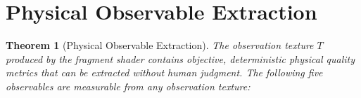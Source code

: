 \documentclass[11pt,twocolumn,a4paper]{article}
\newtheorem{theorem}{Theorem}[section]
\begin{document}

\section{Physical Observable Extraction}
\label{sec:observables}

\begin{theorem}[Physical Observable Extraction]
\label{thm:observables}
The observation texture $T$ produced by the fragment shader contains
objective, deterministic physical quality metrics that can be
extracted without human judgment. The following five observables are
measurable from any observation texture:
\end{theorem}
\end{document}
